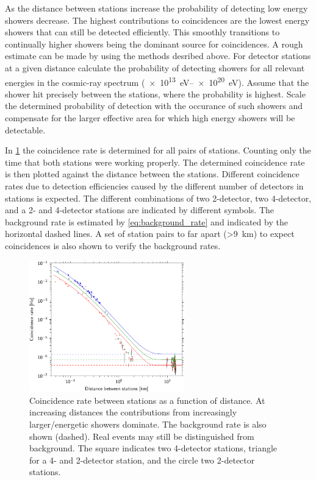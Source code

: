 As the distance between stations increase the probability of detecting low energy showers decrease. The highest contributions to coincidences are the lowest energy showers that can still be detected efficiently. This smoothly transitions to continually higher showers being the dominant source for coincidences. A rough estimate can be made by using the methods desribed above. For detector stations at a given distance calculate the probability of detecting showers for all relevant energies in the cosmic-ray spectrum (\SIrange{e13}{e20}{\eV}). Assume that the shower hit precisely between the stations, where the probability is highest. Scale the determined probability of detection with the occurance of such showers and compensate for the larger effective area for which high energy showers will be detectable.

In \cref{fig:distance_v_coincidence_rate} the coincidence rate is determined for all pairs of stations. Counting only the time that both stations were working properly. The determined coincidence rate is then plotted against the distance between the stations. Different coincidence rates due to detection efficiencies caused by the different number of detectors in stations is expected. The different combinations of two 2-detector, two 4-detector, and a 2- and 4-detector stations are indicated by different symbols. The background rate is estimated by \cref{eq:background_rate} and indicated by the horizontal dashed lines. A set of station pairs to far apart (\SI{>9}{\kilo\meter}) to expect coincidences is also shown to verify the background rates.

\begin{figure}
    \centering
    \includegraphics[width=0.6\textwidth]
                    {plots/experiment/distance_v_coincidence_rate}
    \caption{Coincidence rate between stations as a function of distance. At increasing distances the contributions from increasingly larger/energetic showers dominate. The background rate is also shown (dashed). Real events may still be distinguished from background. The square indicates two 4-detector stations, triangle for a 4- and 2-detector station, and the circle two 2-detector stations.}
    \label{fig:distance_v_coincidence_rate}
\end{figure}

